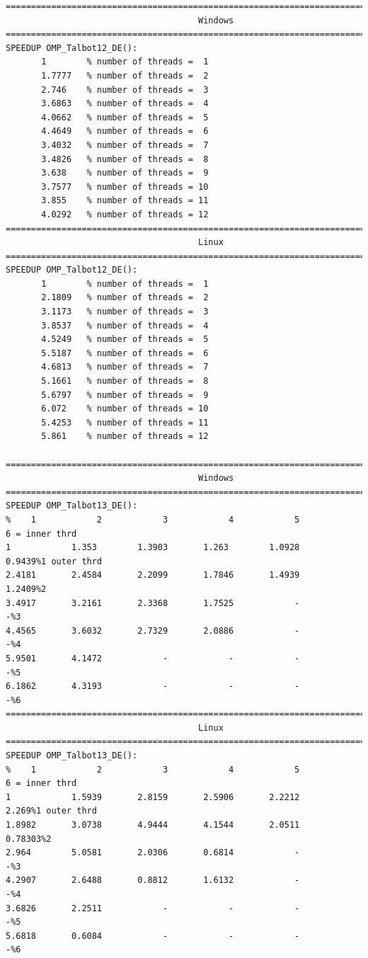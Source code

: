 \documentclass[a4paper,10pt]{report}%
\begin{document}
\begin{lstlisting}
====================================================================================
                                      Windows
====================================================================================
SPEEDUP OMP_Talbot12_DE():
       1        % number of threads =  1
       1.7777   % number of threads =  2
       2.746    % number of threads =  3
       3.6863   % number of threads =  4
       4.0662   % number of threads =  5
       4.4649   % number of threads =  6
       3.4032   % number of threads =  7
       3.4826   % number of threads =  8
       3.638    % number of threads =  9
       3.7577   % number of threads = 10
       3.855    % number of threads = 11
       4.0292   % number of threads = 12
====================================================================================
                                      Linux
====================================================================================
SPEEDUP OMP_Talbot12_DE():
       1        % number of threads =  1
       2.1809   % number of threads =  2
       3.1173   % number of threads =  3
       3.8537   % number of threads =  4
       4.5249   % number of threads =  5
       5.5187   % number of threads =  6
       4.6813   % number of threads =  7
       5.1661   % number of threads =  8
       5.6797   % number of threads =  9
       6.072    % number of threads = 10
       5.4253   % number of threads = 11
       5.861    % number of threads = 12

====================================================================================
                                      Windows
====================================================================================
SPEEDUP OMP_Talbot13_DE():
%    1            2            3            4            5            6 = inner thrd
1            1.353        1.3903       1.263        1.0928       0.9439%1 outer thrd
2.4181       2.4584       2.2099       1.7846       1.4939       1.2409%2
3.4917       3.2161       2.3368       1.7525            -            -%3
4.4565       3.6032       2.7329       2.0886            -            -%4
5.9501       4.1472            -            -            -            -%5
6.1862       4.3193            -            -            -            -%6
====================================================================================
                                      Linux
====================================================================================
SPEEDUP OMP_Talbot13_DE():
%    1            2            3            4            5            6 = inner thrd
1            1.5939       2.8159       2.5906       2.2212        2.269%1 outer thrd
1.8982       3.0738       4.9444       4.1544       2.0511      0.78303%2
2.964        5.0581       2.0306       0.6814            -            -%3
4.2907       2.6488       0.8812       1.6132            -            -%4
3.6826       2.2511            -            -            -            -%5
5.6818       0.6084            -            -            -            -%6
\end{lstlisting}
\end{document}
